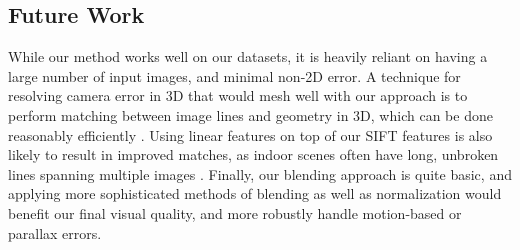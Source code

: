 \documentclass[]{spie}  %
\begin{document}
\subsection{Future Work}
While our method works well on our datasets, it is heavily reliant on
having a large number of input images, and minimal non-2D error. A
technique for resolving camera error in 3D that would mesh well with
our approach is to perform matching between image lines and geometry
in 3D, which can be done reasonably efficiently \cite{linebased,
  rectangularstructures}. Using linear features on top of our SIFT
features is also likely to result in improved matches, as indoor
scenes often have long, unbroken lines spanning multiple images
\cite{linearposeestimation}. Finally, our blending approach is quite
basic, and applying more sophisticated methods of blending as well as
normalization would benefit our final visual quality, and more
robustly handle motion-based or parallax errors.
\end{document}
